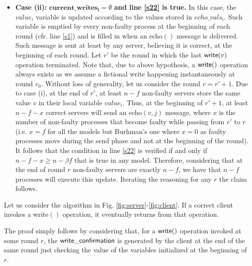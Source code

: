 \begin{proofL}
\begin{itemize}
\item {\bf Case (ii):} $\mathbf{current\_writes_i = \emptyset}$ {\bf and line \ref{s22} is true.} In this case, the $value_i$ variable is updated according to the values stored in $echo\_vals_i$. Such variable is emptied by every non-faulty process at the beginning of each round (cfr. line \ref{s1}) and is filled in when an {\sc echo}$()$ message is delivered.
Such message is sent at least by any server, believing it is correct, at the beginning of each round.
Let $r'$ be the round in which the last ${\sf write}(v)$ operation terminated. Note that, due to above hypothesis, a ${\sf write}()$ operation always exists as we assume a fictional write happening instantaneously at round $r_0$. Without loss of generality, let us consider the round $r=r'+1$.
Due to case (i), at the end of $r'$, at least $n-f$ non-faulty servers store the same value $v$ in their local variable $value_i$.
Thus, at the beginning of $r'+1$, at least $n-f-x$ correct servers will send an {\sc echo}$(v, j)$ message, where $x$ is the number of non-faulty processes that become faulty while passing from $r'$ to $r$ (i.e. $x=f$ for all the models but Burhman's one where $x=0$ as faulty processes move during the send phase and not at the beginning of the round).
It follows that the condition in line \ref{s22} is verified if and only if $n-f-x \ge n-\beta f$ that is true in any model.
Therefore, considering that at the end of round $r$ non-faulty servers are exactly $n-f$, we have that $n-f$ processes will execute this update.
Iterating the reasoning for any $r$ the claim follows.

\end{itemize}


\renewcommand{\toto}{l:consistencyEndGBS}
\end{proofL}














\begin{lemma}\label{l:writeTermination}
Let us consider the algorithm in Fig. \ref{fig:server}-\ref{fig:client}. If a correct client invokes a {\sf write}$()$ operation, it eventually returns from that operation. 
\end{lemma}

\begin{proofL}
	The proof simply follows by considering that, for a ${\sf write}()$ operation invoked at some round $r$,  the ${\sf write\_confirmation}$ is generated by the client at the end of the same round just checking the value of the variables initialized at the beginning of $r$.
\renewcommand{\toto}{l:writeTermination}
\end{proofL}
	
